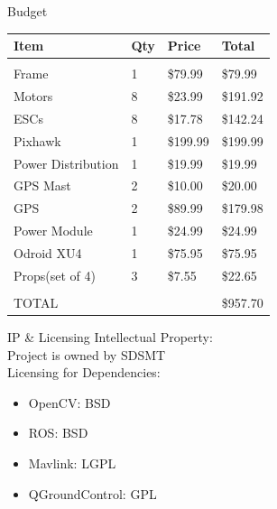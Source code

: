 \documentclass[11pt]{beamer}
\begin{document}
\begin{frame}{Budget}
\begin{table}[]
\centering
\begin{tabular}{|l|l|l|l|}
\hline
Item               & Qty & Price    & Total    \\ \hline
                   &     &          &          \\ \hline
Frame              & 1   & \$79.99  & \$79.99  \\ \hline
Motors             & 8   & \$23.99  & \$191.92 \\ \hline
ESCs               & 8   & \$17.78  & \$142.24 \\ \hline
Pixhawk            & 1   & \$199.99 & \$199.99 \\ \hline
Power Distribution & 1   & \$19.99  & \$19.99  \\ \hline
GPS Mast           & 2   & \$10.00  & \$20.00  \\ \hline
GPS                & 2   & \$89.99  & \$179.98 \\ \hline
Power Module       & 1   & \$24.99  & \$24.99  \\ \hline
Odroid XU4         & 1   & \$75.95  & \$75.95  \\ \hline
Props(set of 4)    & 3   & \$7.55   & \$22.65  \\ \hline
                   &     &          &          \\ \hline
TOTAL              &     &          & \$957.70 \\ \hline
\end{tabular}
\end{table}


\end{frame}


\begin{frame}{IP \& Licensing}
Intellectual Property:\\
Project is owned by SDSMT\\
\vspace{4mm}
Licensing for Dependencies:
\begin{itemize}
\item OpenCV: BSD 
\item ROS: BSD
\item Mavlink: LGPL
\item QGroundControl: GPL
\end{itemize}


\end{frame}

\end{document}
